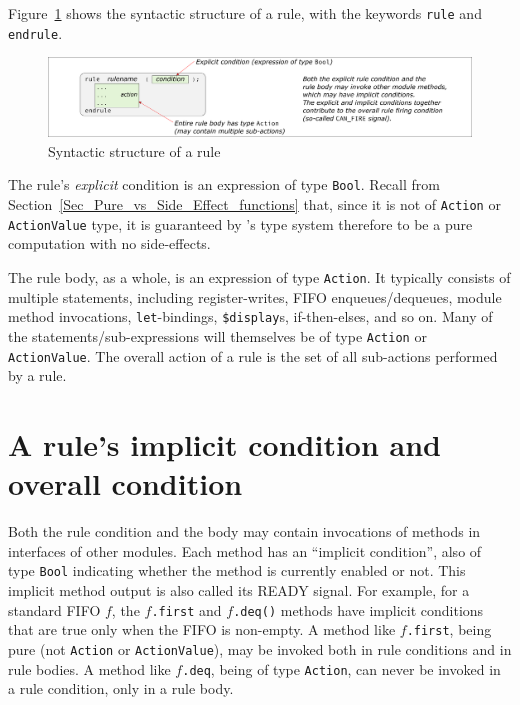 
Figure~\ref{Fig_Rule_Structure} shows the syntactic structure of a
rule, with the keywords \verb|rule| and \verb|endrule|.
\begin{figure}[htbp]
  \centerline{\includegraphics[width=6in,angle=0]{Figures/Fig_Rule_Structure}}
  \caption{\label{Fig_Rule_Structure} Syntactic structure of a rule}
\end{figure}


The rule's \emph{explicit} condition is an expression of type
\verb|Bool|.  Recall from
Section~\ref{Sec_Pure_vs_Side_Effect_functions} that, since it is not
of \verb|Action| or \verb|ActionValue| type, it is guaranteed by {\BSV}'s
type system therefore to be a pure computation with no side-effects.


The rule body, as a whole, is an expression of type \verb|Action|.  It
typically consists of multiple statements, including register-writes,
FIFO enqueues/dequeues, module method invocations,
\verb|let|-bindings, \verb|$display|s, if-then-elses, and so on.
Many of the statements/sub-expressions will themselves be of type
\verb|Action| or \verb|ActionValue|.  The overall action of a rule is
the set of all sub-actions performed by a rule.


\section{A rule's implicit condition and overall condition}


Both the rule condition and the body may contain invocations of
methods in interfaces of other modules.  Each method has an ``implicit
condition'', also of type \verb|Bool| indicating whether the method is
currently enabled or not.  This implicit method output is also called
its READY signal.  For example, for a standard FIFO $f$, the
$f$\verb|.first| and $f$\verb|.deq()| methods have implicit conditions
that are true only when the FIFO is non-empty.  A method like
$f$\verb|.first|, being pure (not \verb|Action| or
\verb|ActionValue|), may be invoked both in rule conditions and in
rule bodies.  A method like $f$\verb|.deq|, being of type
\verb|Action|, can never be invoked in a rule condition, only in a
rule body.

